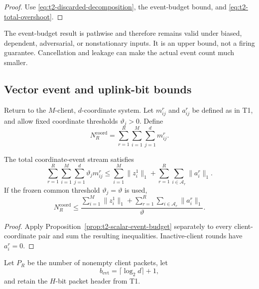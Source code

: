 \begin{proof}
Use \eqref{eq:t2-discarded-decomposition}, the event-budget bound, and \eqref{eq:t2-total-overshoot}.
\end{proof}

The event-budget result is pathwise and therefore remains valid under biased, dependent, adversarial, or nonstationary inputs. It is an upper bound, not a firing guarantee. Cancellation and leakage can make the actual event count much smaller.

\subsection{Vector event and uplink-bit bounds}

Return to the $M$-client, $d$-coordinate system. Let $m_{ij}^r$ and $a_{ij}^r$ be defined as in T1, and allow fixed coordinate thresholds $\vartheta_j>0$. Define
\begin{equation}
    N_R^{\mathrm{coord}}
    =
    \sum_{r=1}^{R}
    \sum_{i=1}^{M}
    \sum_{j=1}^{d}
    m_{ij}^r.
    \label{eq:t2-total-coordinate-events}
\end{equation}

\begin{proposition}
\label{prop:t2-vector-event-budget}
The total coordinate-event stream satisfies
\begin{equation}
    \sum_{r=1}^{R}
    \sum_{i=1}^{M}
    \sum_{j=1}^{d}
    \vartheta_jm_{ij}^r
    \leq
    \sum_{i=1}^{M}\|z_i^1\|_1
    +
    \sum_{r=1}^{R}
    \sum_{i\in\mathcal{A}_r}
    \|a_i^r\|_1.
    \label{eq:t2-vector-weighted-budget}
\end{equation}
If the frozen common threshold $\vartheta_j=\vartheta$ is used,
\begin{equation}
    N_R^{\mathrm{coord}}
    \leq
    \frac{
        \sum_{i=1}^{M}\|z_i^1\|_1
        +
        \sum_{r=1}^{R}\sum_{i\in\mathcal{A}_r}\|a_i^r\|_1
    }{\vartheta}.
    \label{eq:t2-vector-event-budget}
\end{equation}
\end{proposition}

\begin{proof}
Apply Proposition~\ref{prop:t2-scalar-event-budget} separately to every client-coordinate pair and sum the resulting inequalities. Inactive-client rounds have $a_i^r=0$.
\end{proof}

Let $P_R$ be the number of nonempty client packets, let
\begin{equation}
    b_{\mathrm{evt}}
    =
    \lceil\log_2d\rceil+1,
\end{equation}
and retain the $H$-bit packet header from T1.

